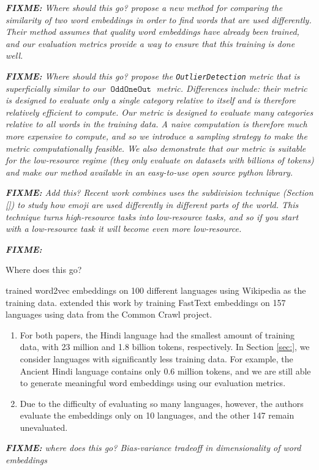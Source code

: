 \documentclass[11pt,a4paper]{article}
\DeclareMathOperator{\OddOneOut}{\texttt{OddOneOut}}
\newcommand{\fixme}[1]{{\color{red}\itshape \textbf{FIXME:} {#1}}}
\begin{document}
{\fixme{Where should this go?
\citet{gonen2020simple} propose a new method for comparing the similarity of two word embeddings in order to find words that are used differently.
Their method assumes that quality word embeddings have already been trained,
and our evaluation metrics provide a way to ensure that this training is done well.
}

\fixme{Where should this go?
\citet{camacho-collados-navigli-2016-find} propose the \texttt{OutlierDetection} metric that is superficially similar to our $\OddOneOut$ metric.
Differences include: their metric is designed to evaluate only a single category relative to itself and is therefore relatively efficient to compute.
Our metric is designed to evaluate many categories relative to all words in the training data.
A naive computation is therefore much more expensive to compute,
and so we introduce a sampling strategy to make the metric computationally feasible.
We also demonstrate that our metric is suitable for the low-resource regime (they only evaluate on datasets with billions of tokens) and make our method available in an easy-to-use open source python library.
}

\fixme{Add this?
Recent work \citet{guntuku2019studying} combines uses the subdivision technique (Section \ref{}) to study how emoji are used differently in different parts of the world.
This technique turns high-resource tasks into low-resource tasks,
and so if you start with a low-resource task it will become even more low-resource.
}

\fixme{
Where does this go?

\citet{al2013polyglot} trained word2vec embeddings on 100 different languages using Wikipedia as the training data.
\citet{grave2018learning} extended this work by training FastText embeddings on 157 languages using data from the Common Crawl project.
\begin{enumerate}
\item
For both papers, the Hindi language had the smallest amount of training data,
with 23 million and 1.8 billion tokens, respectively.
In Section \ref{sec:}, we consider languages with significantly less training data.
For example, the Ancient Hindi language contains only 0.6 million tokens,
and we are still able to generate meaningful word embeddings using our evaluation metrics.

\item
Due to the difficulty of evaluating so many languages, however, the authors evaluate the embeddings only on 10 languages,
and the other 147 remain unevaluated.
\end{enumerate}
}


\fixme{where does this go?
Bias-variance tradeoff in dimensionality of word embeddings \cite{yin2018dimensionality}
}
}
\end{document}
